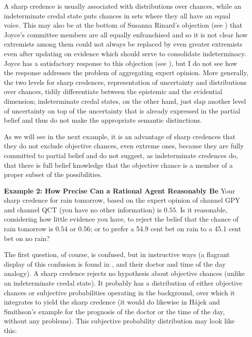A sharp credence is usually associated with distributions over chances, while an indeterminate credal state puts chances in sets where they all have an equal voice. This may also be at the bottom of Susanna Rinard's objection (see ) that Joyce's committee members are all equally enfranchised and so it is not clear how extremists among them could not always be replaced by even greater extremists even after updating on evidence which should serve to consolidate indeterminacy. Joyce has a satisfactory response to this objection (see ), but I do not see how the response addresses the problem of aggregating expert opinion. More generally, the two levels for sharp credences, representation of uncertainty and distributions over chances, tidily differentiate between the epistemic and the evidential dimension; indeterminate credal states, on the other hand, just slap another level of uncertainty on top of the uncertainty that is already expressed in the partial belief and thus do not make the appropriate semantic distinctions.

As we will see in the next example, it is an advantage of sharp credences that they do not exclude objective chances, even extreme ones, because they are fully committed to partial belief and do not suggest, as indeterminate credences do, that there is full belief knowledge that the objective chance is a member of a proper subset of the possibilities.

\begin{quotex}
  \textbf{Example 2: How Precise Can a Rational Agent Reasonably Be} Your sharp credence for rain tomorrow, based on the expert opinion of channel GPY and channel QCT (you have no other information) is $0.55$. Is it reasonable, considering how little evidence you have, to reject the belief that the chance of rain tomorrow is $0.54$ or $0.56$; or to prefer a 54.9 cent bet on rain to a 45.1 cent bet on no rain?
\end{quotex}

The first question, of course, is confused, but in instructive ways (a flagrant display of this confusion is found in , and their doctor and time of the day analogy). A sharp credence rejects no hypothesis about objective chances (unlike an indeterminate credal state). It probably has a distribution of either objective chances or subjective probabilities operating in the background, over which it integrates to yield the sharp credence (it would do likewise in H{\'a}jek and Smithson's example for the prognosis of the doctor or the time of the day, without any problems). This subjective probability distribution may look like this:

